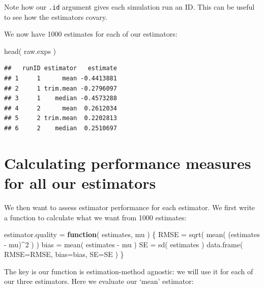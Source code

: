 \documentclass[
]{book}
\newenvironment{Shaded}{\begin{snugshade}}{\end{snugshade}}
\newcommand{\AttributeTok}[1]{\textcolor[rgb]{0.77,0.63,0.00}{#1}}
\newcommand{\ControlFlowTok}[1]{\textcolor[rgb]{0.13,0.29,0.53}{\textbf{#1}}}
\newcommand{\DecValTok}[1]{\textcolor[rgb]{0.00,0.00,0.81}{#1}}
\newcommand{\FunctionTok}[1]{\textcolor[rgb]{0.00,0.00,0.00}{#1}}
\newcommand{\NormalTok}[1]{#1}
\newcommand{\OtherTok}[1]{\textcolor[rgb]{0.56,0.35,0.01}{#1}}
\newcommand{\SpecialCharTok}[1]{\textcolor[rgb]{0.00,0.00,0.00}{#1}}
\begin{document}
Note how our \texttt{.id} argument gives each simulation run an ID. This can be
useful to see how the estimators covary.

We now have 1000 estimates for each of our estimators:

\begin{Shaded}
\begin{Highlighting}[]
\FunctionTok{head}\NormalTok{( raw.exps )}
\end{Highlighting}
\end{Shaded}

\begin{verbatim}
##   runID estimator   estimate
## 1     1      mean -0.4413881
## 2     1 trim.mean -0.2796097
## 3     1    median -0.4573288
## 4     2      mean  0.2612034
## 5     2 trim.mean  0.2202813
## 6     2    median  0.2510697
\end{verbatim}

\hypertarget{calculating-performance-measures-for-all-our-estimators}{%
\section{Calculating performance measures for all our estimators}\label{calculating-performance-measures-for-all-our-estimators}}

We then want to assess estimator performance for each estimator.
We first write a function to calculate what we want from 1000 estimates:

\begin{Shaded}
\begin{Highlighting}[]
\NormalTok{estimator.quality }\OtherTok{=} \ControlFlowTok{function}\NormalTok{( estimates, mu ) \{}
\NormalTok{    RMSE }\OtherTok{=} \FunctionTok{sqrt}\NormalTok{( }\FunctionTok{mean}\NormalTok{( (estimates }\SpecialCharTok{{-}}\NormalTok{ mu)}\SpecialCharTok{\^{}}\DecValTok{2}\NormalTok{ ) )}
\NormalTok{    bias }\OtherTok{=} \FunctionTok{mean}\NormalTok{( estimates }\SpecialCharTok{{-}}\NormalTok{ mu )}
\NormalTok{    SE }\OtherTok{=} \FunctionTok{sd}\NormalTok{( estimates )}
    \FunctionTok{data.frame}\NormalTok{( }\AttributeTok{RMSE=}\NormalTok{RMSE, }\AttributeTok{bias=}\NormalTok{bias, }\AttributeTok{SE=}\NormalTok{SE )}
\NormalTok{\}}
\end{Highlighting}
\end{Shaded}

The key is our function is estimation-method agnostic: we will use it for each of our three estimators.
Here we evaluate our `mean' estimator:
\end{document}
